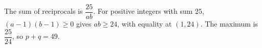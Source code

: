 The sum of reciprocals is $\dfrac{25}{ab}$. For positive integers with sum $25$, $(a-1)(b-1)\ge0$ gives $ab\ge24$, with equality at $(1,24)$. The maximum is $\dfrac{25}{24}$, so $p+q=\boxed{49}$.
